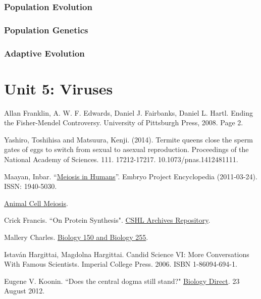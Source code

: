 \documentclass[12pt]{article}
\begin{document}
\subsubsection{Population Evolution}
\subsubsection{Population Genetics}
\subsubsection{Adaptive Evolution}

\section{Unit 5: Viruses}

\begin{thebibliography}{00}
     Allan Franklin, A. W. F. Edwards, Daniel J. Fairbanks, Daniel L. Hartl. Ending the Fisher-Mendel Controversy. University of Pittsburgh Press, 2008. Page 2.

     Yashiro, Toshihisa and Matsuura, Kenji. (2014). Termite queens close the sperm gates of eggs to switch from sexual to asexual reproduction. Proceedings of the National Academy of Sciences. 111. 17212-17217. 10.1073/pnas.1412481111. 

     Maayan, Inbar. ``\href{http://embryo.asu.edu/handle/10776/2084}{Meiosis in Humans}''. Embryo Project Encyclopedia (2011-03-24). ISSN: 1940-5030. 

     \href{https://www.cellsalive.com/meiosis_js.htm}{Animal Cell Meiosis}.

     Crick Francis. ``On Protein Synthesis". \href{https://libgallery.cshl.edu}{CSHL Archives Repository}.

     Mallery Charles. \href{http://henge.bio.miami.edu/mallery/150/}{Biology 150 and Biology 255}.
        
     Istav{\'a}n Hargittai, Magdolna Hargittai. Candid Science VI: More Conversations With Famous Scientists. Imperial College Press. 2006. ISBN 1-86094-694-1.

     Eugene V. Koonin. ``Does the central dogma still stand?" \href{https://biologydirect.biomedcentral.com/articles/10.1186/1745-6150-7-27}{Biology Direct}. 23 August 2012. 
        

\end{thebibliography}
\end{document}

